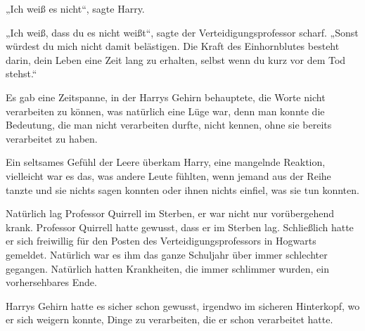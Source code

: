 „Ich weiß es nicht“, sagte Harry.

„Ich weiß, dass du es nicht weißt“, sagte der Verteidigungsprofessor scharf.
„Sonst würdest du mich nicht damit belästigen. Die Kraft des Einhornblutes besteht darin, dein Leben eine Zeit lang zu erhalten, selbst wenn du kurz vor dem Tod stehst.“

Es gab eine Zeitspanne, in der Harrys Gehirn behauptete, die Worte nicht verarbeiten zu können, was natürlich eine Lüge war, denn man konnte die Bedeutung, die man nicht verarbeiten durfte, nicht kennen, ohne sie bereits verarbeitet zu haben.

Ein seltsames Gefühl der Leere überkam Harry, eine mangelnde Reaktion, vielleicht war es das, was andere Leute fühlten, wenn jemand aus der Reihe tanzte und sie nichts sagen konnten oder ihnen nichts einfiel, was sie tun konnten.

Natürlich lag Professor Quirrell im Sterben, er war nicht nur vorübergehend krank. Professor Quirrell hatte gewusst, dass er im Sterben lag. Schließlich hatte er sich freiwillig für den Posten des Verteidigungsprofessors in Hogwarts gemeldet. Natürlich war es ihm das ganze Schuljahr über immer schlechter gegangen. Natürlich hatten Krankheiten, die immer schlimmer wurden, ein vorhersehbares Ende.

Harrys Gehirn hatte es sicher schon gewusst, irgendwo im sicheren Hinterkopf, wo er sich weigern konnte, Dinge zu verarbeiten, die er schon verarbeitet hatte.

